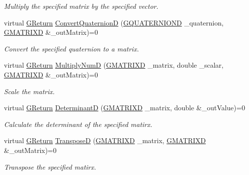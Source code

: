 \begin{DoxyCompactItemize}
\begin{DoxyCompactList}\small\item\em Multiply the specified matrix by the specified vector. \end{DoxyCompactList}\item 
virtual \hyperlink{namespaceGW_a67a839e3df7ea8a5c5686613a7a3de21}{G\+Return} \hyperlink{classGW_1_1MATH_1_1GMatrix_a602c82afc9b9f55c10d6a61da54dcb6c}{Convert\+QuaternionD} (\hyperlink{structGW_1_1MATH_1_1GQUATERNIOND}{G\+Q\+U\+A\+T\+E\+R\+N\+I\+O\+ND} \+\_\+quaternion, \hyperlink{structGW_1_1MATH_1_1GMATRIXD}{G\+M\+A\+T\+R\+I\+XD} \&\+\_\+out\+Matrix)=0
\begin{DoxyCompactList}\small\item\em Convert the specified quaternion to a matrix. \end{DoxyCompactList}\item 
virtual \hyperlink{namespaceGW_a67a839e3df7ea8a5c5686613a7a3de21}{G\+Return} \hyperlink{classGW_1_1MATH_1_1GMatrix_a34e78f82e720eba937824cdc06490b9c}{Multiply\+NumD} (\hyperlink{structGW_1_1MATH_1_1GMATRIXD}{G\+M\+A\+T\+R\+I\+XD} \+\_\+matrix, double \+\_\+scalar, \hyperlink{structGW_1_1MATH_1_1GMATRIXD}{G\+M\+A\+T\+R\+I\+XD} \&\+\_\+out\+Matrix)=0
\begin{DoxyCompactList}\small\item\em Scale the matrix. \end{DoxyCompactList}\item 
virtual \hyperlink{namespaceGW_a67a839e3df7ea8a5c5686613a7a3de21}{G\+Return} \hyperlink{classGW_1_1MATH_1_1GMatrix_ab1b528820ac0476f8f3d9202a3036b8c}{DeterminantD} (\hyperlink{structGW_1_1MATH_1_1GMATRIXD}{G\+M\+A\+T\+R\+I\+XD} \+\_\+matrix, double \&\+\_\+out\+Value)=0
\begin{DoxyCompactList}\small\item\em Calculate the determinant of the specified matirx. \end{DoxyCompactList}\item 
virtual \hyperlink{namespaceGW_a67a839e3df7ea8a5c5686613a7a3de21}{G\+Return} \hyperlink{classGW_1_1MATH_1_1GMatrix_add9f6f4f4689e683143990b434248404}{TransposeD} (\hyperlink{structGW_1_1MATH_1_1GMATRIXD}{G\+M\+A\+T\+R\+I\+XD} \+\_\+matrix, \hyperlink{structGW_1_1MATH_1_1GMATRIXD}{G\+M\+A\+T\+R\+I\+XD} \&\+\_\+out\+Matrix)=0
\begin{DoxyCompactList}\small\item\em Transpose the specified matirx. \end{DoxyCompactList}\item 

\end{DoxyCompactItemize}
